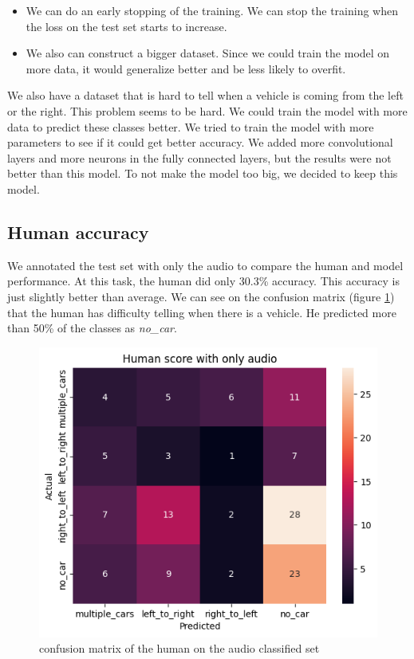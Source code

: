 \begin{itemize}
    \item We can do an early stopping of the training. We can stop the training when the loss on the test set starts to increase. 
    \item We also can construct a bigger dataset. Since we could train the model on more data, it would generalize better and be less likely to overfit.
\end{itemize}

We also have a dataset that is hard to tell when a vehicle is coming from the left or the right. This problem seems to be hard. We could train the model with more data to predict these classes better. We tried to train the model with more parameters to see if it could get better accuracy. We added more convolutional layers and more neurons in the fully connected layers, but the results were not better than this model. To not make the model too big, we decided to keep this model.

\subsection{Human accuracy}

We annotated the test set with only the audio to compare the human and model performance. At this task, the human did only 30.3\% accuracy. This accuracy is just slightly better than average. We can see on the confusion matrix (figure \ref{fig:human_score_only_audio}) that the human has difficulty telling when there is a vehicle. He predicted more than 50\% of the classes as \textit{no\_car}. 

\begin{figure}[H]
    \centering
    \includegraphics[width=1\textwidth]{images/human_score_only_audio.png}
    \caption{confusion matrix of the human on the audio classified set}
    \label{fig:human_score_only_audio}
\end{figure}

